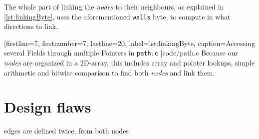 The whole part of linking the \emph{nodes} to their neighbours,
as explained in \ref{lst:linkingByte},
uses the aforementioned {\tt walls} byte,
to compute in what directions to link.


[firstline=7,				%
firstnumber=7,
lastline=20,
label=lst:linkingByte,	%
caption={Accessing several Fields through multiple Pointers in {\tt path.c}}
]{code/path.c}
%
Because our \emph{nodes} are organized in a 2D-array,
this includes array and pointer lookups,
simple arithmetic and
bitwise comparison
to find both \emph{nodes} and link them.

\section{Design flaws}
edges are defined twice, from both nodes
